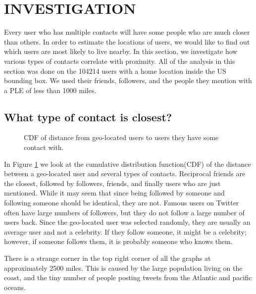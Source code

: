 \documentclass{sig-alternate}
\begin{document}
\begin{figure*}
\centering
{}
\caption{
Hi! This needs to move!
}
\label{fig:LocalAll}
\end{figure*}

\section{INVESTIGATION}
Every user who has multiple contacts will have some people who are much
closer than others. In order to estimate the locations of users, we would like
to find out which users are most likely to live nearby.  In this section, we
investigate how various types of contacts correlate with proximity.
All of the analysis in this section was done on the 104214 users with a home location inside the US bounding box. We used their friends, followers, and the people they mention with a PLE of less than 1000 miles.

\subsection{What type of contact is closest?}
\begin{figure}
\centering
{}
\caption{
CDF of distance from geo-located users to users they have some contact
with.
}
\label{fig:EdgeTypesCum}
\end{figure}
In Figure \ref{fig:EdgeTypesCum} we look at the cumulative distribution function(CDF) of the distance between a geo-located user and several types of contacts.
Reciprocal friends are the closest, followed by followers, friends, and finally users who are just mentioned.
While it may seem that since being followed by someone and following someone should be identical, they are not.
Famous users on Twitter often have large numbers of followers, but they do not follow a large number of users back.
Since the geo-located user was selected randomly, they are usually an average user and not a celebrity.
If they follow someone, it might be a celebrity; however, if someone follows them, it is probably someone who knows them.

There is a strange corner in the top right corner of all the graphs at approximately 2500 miles. This is caused by the large population living on the coast, and the tiny number of people posting tweets from the Atlantic and pacific oceans.
\end{document}
